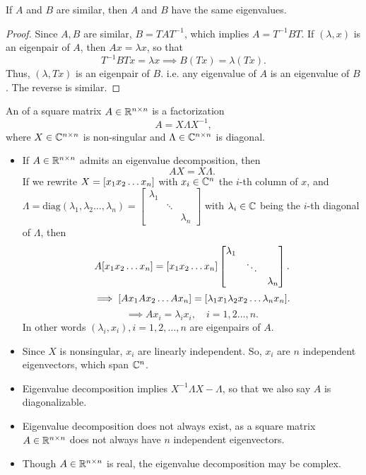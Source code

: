 \documentclass[../main/main.tex]{subfiles}
\begin{document}
\begin{theorem}
	If $A$ and $B$ are similar, then $A$ and $B$ have the same eigenvalues.
\end{theorem}
\begin{proof}
		Since $A,B$ are similar, $B=TAT^{-1}$, which implies $A=T^{-1}BT$. If $\left( \lambda, x \right) $ is an eigenpair of $A$, then $Ax=\lambda x$, so that \[
				T^{-1}BTx=\lambda x\implies B\left( Tx \right) =\lambda\left( Tx \right) 
		.\] Thus, $\left( \lambda, Tx \right) $ is an eigenpair of $B$. i.e. any eigenvalue of $A$ is an eigenvalue of $B$. The reverse is similar.
\end{proof}
\begin{definition}
	An  of a square matrix $A\in \mathbb{R}^{n\times n}$ is a factorization \[
		A=X\Lambda X^{-1}
		,\] where $X\in\mathbb{C}^{n\times n}$ is non-singular and $\Lambda\in\mathbb{C}^{n\times n}$ is diagonal.
\end{definition}
\begin{itemize}
		\item If $A\in \mathbb{R}^{n\times n}$ admits an eigenvalue decomposition, then \[
		AX=X\Lambda
	.\] If we rewrite $X=[x_1\space x_2\space \ldots\space x_n]$ with $x_{i}\in \mathbb{C}^{n}$ the $i$-th column of $x$, and $\Lambda=\text{diag}(\lambda_1,\lambda_2\ldots,\lambda_n)=\begin{bmatrix} \lambda_1&&\\&\ddots&\\&&\lambda_n \end{bmatrix} $ with $\lambda_{i}\in \mathbb{C}$ being the $i$-th diagonal of $\Lambda$, then \[
	A[x_1\space x_2\space \ldots\space x_n]=[x_1\space x_2\space \ldots\space x_n]\begin{bmatrix} \lambda_1&&\\&\ddots&\\&&\lambda_n \end{bmatrix}
	.\] \[
		\implies [Ax_1\space Ax_2\space \ldots\space Ax_n]=[\lambda_1 x_1\space \lambda_2 x_2\space \ldots\space \lambda_n x_n]
	.\] \[
		\implies Ax_{i}=\lambda_ix_{i},\quad i=1,2\ldots,n
	.\] 
	In other words $\left( \lambda_i,x_{i} \right) ,i=1,2,\ldots,n$ are eigenpairs of $A$.
\item Since $X$ is nonsingular, $x_{i}$ are linearly independent. So, $x_{i}$ are $n$ independent eigenvectors, which span $\mathbb{C}^{n}$.
\item Eigenvalue decomposition implies $X^{-1}\Lambda X - \Lambda$, so that we also say $A$ is diagonalizable.
\item Eigenvalue decomposition does not always exist, as a square matrix $A\in \mathbb{R}^{n\times n}$ does not always have $n$ independent eigenvectors.
\item Though $A\in \mathbb{R}^{n\times n}$ is real, the eigenvalue decomposition may be complex.
\end{itemize}
\end{document}
